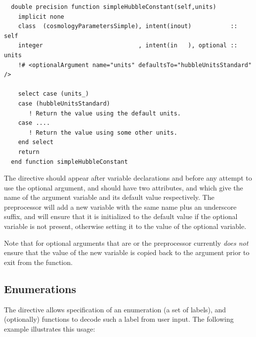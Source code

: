 \begin{lstlisting}
  double precision function simpleHubbleConstant(self,units)
    implicit none
    class  (cosmologyParametersSimple), intent(inout)           :: self
    integer                           , intent(in   ), optional :: units
    !# <optionalArgument name="units" defaultsTo="hubbleUnitsStandard" />

    select case (units_)
    case (hubbleUnitsStandard)
       ! Return the value using the default units.
    case ....
       ! Return the value using some other units.
    end select
    return
  end function simpleHubbleConstant
\end{lstlisting}
The  directive should appear after variable declarations and before any attempt to use the optional argument, and should have two attributes,  and  which give the name of the argument variable and its default value respectively. The preprocessor will add a new variable with the same name plus an underscore suffix, and will ensure that it is initialized to the default value if the optional variable is not present, otherwise setting it to the value of the optional variable.

Note that for optional arguments that are  or  the preprocessor currently \emph{does not} ensure that the value of the new variable is copied back to the argument prior to exit from the function.

\subsection{Enumerations}

The  directive allows specification of an enumeration (a set of labels), and (optionally) functions to decode such a label from user input. The following example illustrates this usage:

